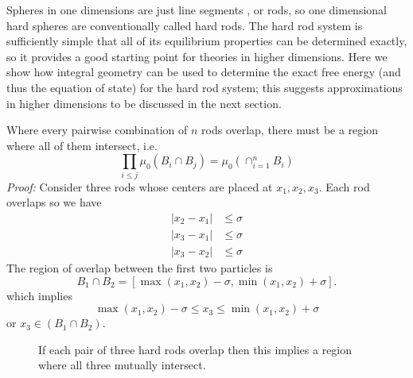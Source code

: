 \documentclass[11pt]{report}
\begin{document}
Spheres in one dimensions are just line segments%
,
or rods, so one dimensional hard spheres are conventionally called hard rods.
The hard rod system is sufficiently simple that all of its equilibrium properties can be determined exactly, so it provides a good starting point for theories in higher dimensions.
Here we show how integral geometry can be used to determine the exact free energy (and thus the equation of state) for the hard rod system; this suggests approximations in higher dimensions to be discussed in the next section.

\begin{tcolorbox}[title=Multiple intersections of hard rods]
  Where every pairwise combination of $n$ rods overlap, there must be a region where all of them intersect, i.e.\
  \begin{equation}
    \prod_{i \le j} \mu_0(B_i \cap B_j) =
    \mu_0(\cap_{i=1}^n B_i)
  \end{equation}
  \emph{Proof:} Consider three rods whose centers are placed at $x_1, x_2, x_3$.
  Each rod overlaps so we have
  \begin{subequations}
    \begin{align}
      |x_2 - x_1| &\le \sigma \\
      |x_3 - x_1| &\le \sigma \\
      |x_3 - x_2| &\le \sigma
    \end{align}
  \end{subequations}
  The region of overlap between the first two particles is
  \begin{equation*}
    B_1 \cap B_2 =
    [\max{(x_1,x_2)} - \sigma, \min{(x_1,x_2)} + \sigma].
  \end{equation*}
  which implies
  \begin{equation}
    \max{(x_1,x_2)} - \sigma \le x_3 \le \min{(x_1,x_2)} + \sigma
  \end{equation}
  or $x_3 \in (B_1 \cap B_2)$.
\end{tcolorbox}

\begin{figure}
  \missingfigure[figwidth=\linewidth]{}
  \caption{If each pair of three hard rods overlap then this implies a region where all three mutually intersect.}
\end{figure}
\end{document}

